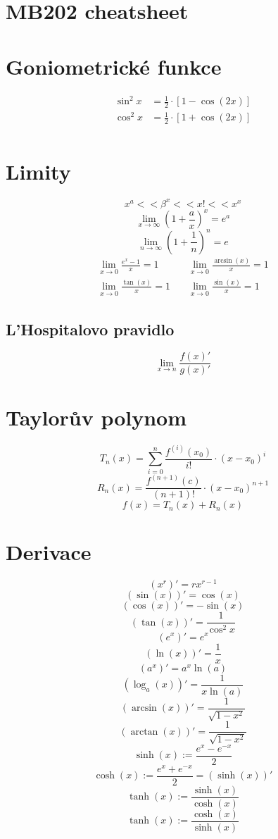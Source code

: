 \documentclass[a4paper]{article}
\begin{document}
\section*{MB202 cheatsheet}

\begin{multicols}{2}
    \section*{Goniometrické funkce}
        \begin{align*}
             \sin^2x &= \frac{1}{2} \cdot \left[ 1-\cos(2x) \right] \\
             \cos^2x &= \frac{1}{2} \cdot \left[ 1+\cos(2x) \right] \\
        \end{align*}
    \section*{Limity}
        \[ {x}^a << {\beta}^x << x! << {x}^x \]
        \[ \lim_{x \rightarrow \infty} {\left(1 + \frac{a}{x}\right)}^x = e^a \]
        \[\lim_{n \rightarrow \infty} {\left(1 + \frac{1}{n}\right)}^n = e \]
        \begin{align*}
            {\lim_{x \rightarrow 0} {\frac{e^x - 1}{x}} = 1} & \quad {\lim_{x \rightarrow 0} {\frac{\arcsin(x)}{x} = 1}}\\
            {\lim_{x \rightarrow 0} \frac{\tan(x)}{x} = 1} & \quad {\lim_{x \rightarrow 0} {\frac{\sin(x)}{x} = 1}}
        \end{align*}
        \subsection*{L'Hospitalovo pravidlo}
            \[  \lim_{x \rightarrow n} \frac{f(x)'}{g(x)'} \]    
    \section*{Taylorův polynom}
        \[ T_n(x) = \sum_{i=0}^{n} \frac{f^{(i)}(x_0)}{i!}\cdot{(x - x_0)}^i \]
        \[ R_n(x) = \frac{f^{(n+1)}(c)}{(n+1)!}\cdot{(x - x_0)}^{n+1} \]
        \[ f(x) = T_n(x) + R_n(x) \]
    \section*{Derivace}
        \[ ({x}^r)' = {rx}^{r-1} \]
        \[ (\sin(x))' = \cos(x) \]
        \[ (\cos(x))' = -\sin(x) \]
        \[ (\tan(x))' = \frac{1}{{\cos}^2 x} \]
        \[ (e^x)' = e^x \]
        \[ (\ln(x))' = \frac{1}{x} \]
        \[ (a^x)' = a^x \ln(a) \]
        \[ (\log_a(x))' = \frac{1}{x\ln(a)} \]
        \[ (\arcsin(x))' = \frac{1}{\sqrt{1-x^2}} \]
        \[ (\arctan(x))' = \frac{1}{\sqrt{1-x^2}} \]
        \[ \sinh(x):= \frac{e^x - e^{-x}}{2} \]
        \[ \cosh(x) := \frac{e^x + e^{-x}}{2} = (\sinh(x))' \]
        \[ \tanh(x) := \frac{\sinh(x)}{\cosh(x)}\]
        \[ \tanh(x) := \frac{\cosh(x)}{\sinh(x)}\]

\end{multicols}
\end{document}
